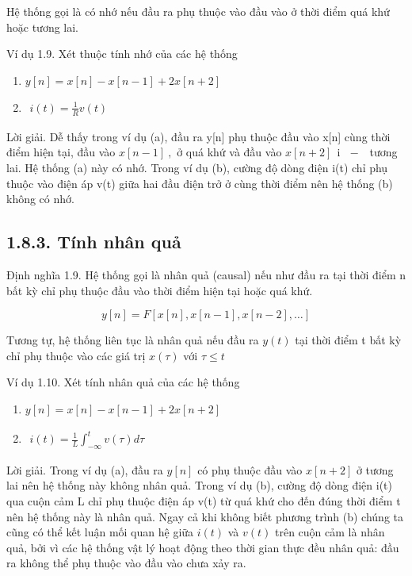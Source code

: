 \documentclass[
  10
]{article}
\begin{document}
Hệ thống gọi là có nhớ nếu đầu ra phụ thuộc vào đầu vào ở thời điểm quá
khứ hoặc tương lai.

Ví dụ 1.9. Xét thuộc tính nhớ của các hệ thống

\begin{enumerate}
\def\labelenumi{(\alph{enumi})}
\item
  \(y [ n ] = x [ n ] - x [ n - 1 ] + 2 x [ n + 2 ]\)
\item
  \(\begin{array} { r } { i ( t ) = \frac { 1 } { R } v ( t ) } \end{array}\)
\end{enumerate}

Lời giải. Dễ thấy trong ví dụ (a), đầu ra y{[}n{]} phụ thuộc đầu vào
x{[}n{]} cùng thời điểm hiện tại, đầu vào \(x [ n - 1 ] \ ,\) ở quá khứ
và đầu vào \(x [ n + 2 ] \mathrm { ~ \ i ~ { ~ \ - ~ } ~ }\) tương lai.
Hệ thống (a) này có nhớ. Trong ví dụ (b), cường độ dòng điện i(t) chỉ
phụ thuộc vào điện áp v(t) giữa hai đầu điện trở ở cùng thời điểm nên hệ
thống (b) không có nhớ. 

\subsection{1.8.3. Tính nhân quả}\label{tuxednh-nhuxe2n-quux1ea3}

Định nghĩa 1.9. Hệ thống gọi là nhân quả (causal) nếu như đầu ra tại
thời điểm n bất kỳ chỉ phụ thuộc đầu vào thời điểm hiện tại hoặc quá
khứ.

\[
y [ n ] = F [ x [ n ], x [ n - 1 ], x [ n - 2 ], \ldots ]
\]

Tương tự, hệ thống liên tục là nhân quả nếu đầu ra \(y ( t )\) tại thời
điểm t bất kỳ chỉ phụ thuộc vào các giá trị \(x ( \tau )\) với
\(\tau \leq t\)

Ví dụ 1.10. Xét tính nhân quả của các hệ thống

\begin{enumerate}
\def\labelenumi{(\alph{enumi})}
\item
  \(y [ n ] = x [ n ] - x [ n - 1 ] + 2 x [ n + 2 ]\)
\item
  \(\begin{array} { r } { i ( t ) = \frac { 1 } { L } \int _ { - \infty } ^ { t } v ( \tau ) d \tau } \end{array}\)
\end{enumerate}

Lời giải. Trong ví dụ (a), đầu ra \(y [ n ]\) có phụ thuộc đầu vào
\(x [ n + 2 ]\) ở tương lai nên hệ thống này không nhân quả. Trong ví dụ
(b), cường độ dòng điện i(t) qua cuộn cảm L chỉ phụ thuộc điện áp v(t)
từ quá khứ cho đến đúng thời điểm t nên hệ thống này là nhân quả. Ngay
cả khi không biết phương trình (b) chúng ta cũng có thể kết luận mối
quan hệ giữa \(i ( t )\) và \(v ( t )\) trên cuộn cảm là nhân quả, bởi
vì các hệ thống vật lý hoạt động theo thời gian thực đều nhân quả: đầu
ra không thể phụ thuộc vào đầu vào chưa xảy ra. 
\end{document}
